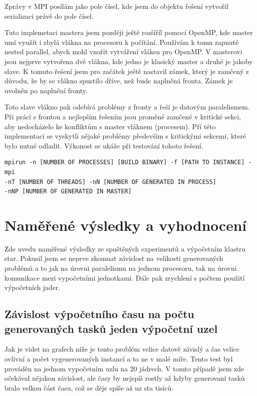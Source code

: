 \documentclass[]{article}
\begin{document}
Zprávy v MPI posílám jako pole čísel, kde jsem do objektu řešení vytvořil serializaci právě do pole čísel.

Tuto implemetaci mastera jsem později ještě rozšíříl pomocí OpenMP, kde master umí využít i zbylá vlákna na procesoru k počítání. Používám k tomu zapnuté nested parallel, abych mohl vnořit vytváření vláken pro OpenMP. V masterovi jsou nejprve vytvořena dvě vlákna, kde jedno je klasický master a druhé je jakoby slave. K tomuto řešení jsem pro začátek ještě nastavil zámek, který je zamčený z důvodu, že by se vlákno spustilo dříve, než bude naplněná fronta. Zámek je uvolněn po naplnění fronty. 

Toto slave vlákno pak odebírá problémy z fronty a řeší je datovým paralelismem. Při práci s frontou a nejlepším řešením jsou proměné zamčené v kritické sekci, aby nedocházelo ke konfliktům s master vláknem (procesem). Pří této implementaci se vyskytli nějaké problémy především s kritickými sekcemi, které bylo nutné odladit. Výkonost se ukáže při testování tohoto řešení.

\begin{verbatim}
mpirun -n [NUMBER OF PROCESSES] [BUILD BINARY] -f [PATH TO INSTANCE] -mpi 
-nT [NUMBER OF THREADS] -nN [NUMBER OF GENERATED IN PROCESS] 
-nNP [NUMBER OF GENERATED IN MASTER]
\end{verbatim}

\section{Naměřené výsledky a vyhodnocení}
Zde uvedu naměřené výsledky ze spuštěných experimentů a výpočetním klastru star. Pokusil jsem se neprve zkoumat závislost na velikosti generovaných problémů a to jak na úrovni paralelismu na jednom procesoru, tak na úrovni komunikace mezi vypočetními jednotkami. Dále pak zrychlení s počtem použití výpočetních jader.

\subsection{Závislost výpočetního času na počtu generovaných tasků jeden výpočetní uzel}

Jak je videt na grafech níže je tento problém velice datově závislý a čas velice ovlivní a počet vygenerovaných instancí a to ne v malé míře. Tento test byl prováděn na jednom vypočetním uzlu na 20 jádrech. V tomto případě jsem zde očekával nějakou závislost, ale časy by nejspíš rostly až kdyby generovaní tasků bralo velkou část času, což se děje spíše až uz sta tisíců.
\end{document}
